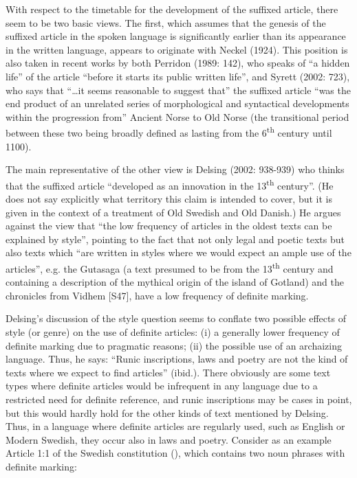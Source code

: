 With respect to the timetable for the development of the suffixed article, there seem to be two basic views. The first, which assumes that the genesis of the suffixed article in the spoken language is significantly earlier than its appearance in the written language, appears to originate with Neckel (1924).  This position is also taken in recent works by both Perridon (1989: 142), who speaks of “a hidden life” of the article “before it starts its public written life”, and Syrett (2002: 723), who says that “…it seems reasonable to suggest that” the suffixed article “was the end product of an unrelated series of morphological and syntactical developments within the progression from” Ancient Norse to Old Norse (the transitional period between these two being broadly defined as lasting from the 6\textsuperscript{th} century until 1100). 

The main representative of the other view is Delsing (2002: 938-939) who thinks that the suffixed article “developed as an innovation in the 13\textsuperscript{th} century”. (He does not say explicitly what territory this claim is intended to cover, but it is given in the context of a treatment of Old Swedish and Old Danish.) He argues against the view that “the low frequency of articles in the oldest texts can be explained by style”, pointing to the fact that not only legal and poetic texts but also texts which “are written in styles where we would expect an ample use of the articles”,  e.g. the Gutasaga (a text presumed to be from the 13\textsuperscript{th} century and containing a description of the mythical origin of the island of Gotland) and the chronicles from Vidhem [S47], have a low frequency of definite marking. 

Delsing’s discussion of the style question seems to conflate two possible effects of style (or genre) on the use of definite articles: (i) a generally lower frequency of definite marking due to pragmatic reasons; (ii) the possible use of an archaizing language. Thus, he says: “Runic inscriptions, laws and poetry are not the kind of texts where we expect to find articles” (ibid.). There obviously are some text types where definite articles would be infrequent in any language due to a restricted need for definite reference, and runic inscriptions may be cases in point, but this would hardly hold for the other kinds of text mentioned by Delsing. Thus, in a language where definite articles are regularly used, such as English or Modern Swedish, they occur also in laws and poetry. Consider as an example Article 1:1 of the Swedish constitution (), which contains two noun phrases with definite marking:

